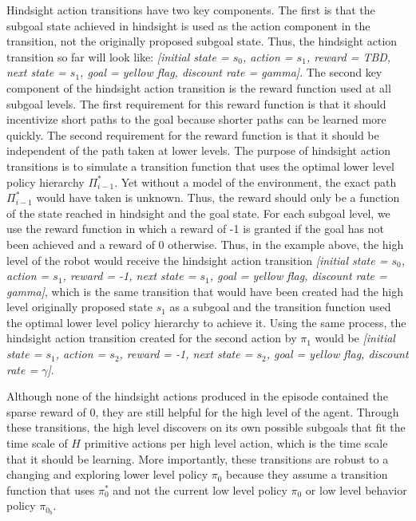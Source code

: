 \documentclass{article} %
\begin{document}
Hindsight action transitions have two key components.  The first is that the subgoal state achieved in hindsight is used as the action component in the transition, not the originally proposed subgoal state.  Thus, the hindsight action transition so far will look like: \textit{[initial state = $s_0$, action = $s_1$, reward = TBD, next state = $s_1$, goal = yellow flag, discount rate = gamma]}.  The second key component of the hindsight action transition is the reward function used at all subgoal levels.  The first requirement for this reward function is that it should incentivize short paths to the goal because shorter paths can be learned more quickly.  The second requirement for the reward function is that it should be independent of the path taken at lower levels.  The purpose of hindsight action transitions is to simulate a transition function that uses the optimal lower level policy hierarchy $\Pi_{i-1}^*$.  Yet without a model of the environment, the exact path $\Pi_{i-1}^*$ would have taken is unknown.  Thus, the reward  should only be a function of the state reached in hindsight and the goal state.  For each subgoal level, we use the reward function in which a reward of -1 is granted if the goal has not been achieved and a reward of 0 otherwise.  Thus, in the example above, the high level of the robot would receive the hindsight action transition \textit{[initial state = $s_0$, action = $s_1$, reward = -1, next state = $s_1$, goal = yellow flag, discount rate = gamma]}, which is the same transition that would have been created had the high level originally proposed state $s_1$ as a subgoal and the transition function used the optimal lower level policy hierarchy to achieve it.  Using the same process, the hindsight action transition created for the second action by $\pi_1$ would be \textit{[initial state = $s_1$, action = $s_2$, reward = -1, next state = $s_2$, goal = yellow flag, discount rate = $\gamma$]}.     


Although none of the hindsight actions produced in the episode contained the sparse reward of 0, they are still helpful for the high level of the agent.  Through these transitions, the high level discovers on its own possible subgoals that fit the time scale of $H$ primitive actions per high level action, which is the time scale that it should be learning.  More importantly, these transitions are robust to a changing and exploring lower level policy $\pi_0$ because they assume a transition function that uses $\pi_0^*$ and not the current low level policy $\pi_0$ or low level behavior policy $\pi_{0_b}$.  
\end{document}
